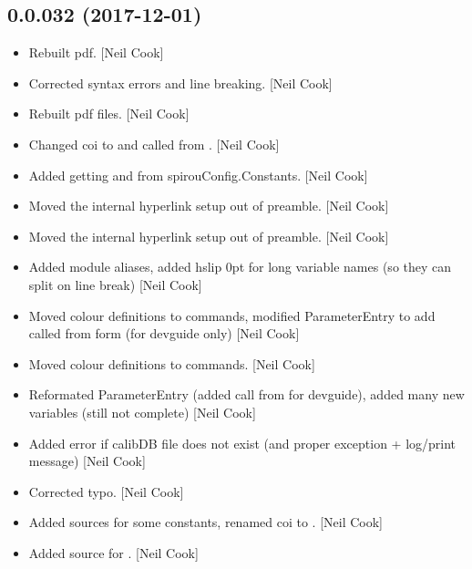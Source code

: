 \documentclass[a4paper,10pt,english]{report}
\begin{document}
\subsection{0.0.032 (2017-12-01)}
\label{\detokenize{misc/changelog:id520}}\begin{itemize}
\item {} 
Rebuilt pdf. {[}Neil Cook{]}

\item {} 
Corrected syntax errors and line breaking. {[}Neil Cook{]}

\item {} 
Rebuilt pdf files. {[}Neil Cook{]}

\item {} 
Changed coi to  and called from . {[}Neil Cook{]}

\item {} 
Added getting  and  from spirouConfig.Constants.
{[}Neil Cook{]}

\item {} 
Moved the internal hyperlink setup out of preamble. {[}Neil Cook{]}

\item {} 
Moved the internal hyperlink setup out of preamble. {[}Neil Cook{]}

\item {} 
Added module aliases, added hslip 0pt for long variable names (so they
can split on line break) {[}Neil Cook{]}

\item {} 
Moved colour definitions to commands, modified ParameterEntry to add
called from form (for devguide only) {[}Neil Cook{]}

\item {} 
Moved colour definitions to commands. {[}Neil Cook{]}

\item {} 
Reformated ParameterEntry (added call from for devguide), added many
new variables (still not complete) {[}Neil Cook{]}

\item {} 
Added error if calibDB file does not exist (and proper exception +
log/print message) {[}Neil Cook{]}

\item {} 
Corrected typo. {[}Neil Cook{]}

\item {} 
Added sources for some constants, renamed coi to . {[}Neil
Cook{]}

\item {} 
Added source for . {[}Neil Cook{]}

\end{itemize}
\end{document}

